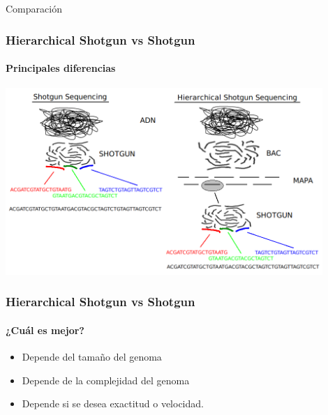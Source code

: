 %


\frame
{
\begin{center}
	\Huge{Comparación}
\end{center}
}

\frame
{
\frametitle{Hierarchical Shotgun vs Shotgun}
\framesubtitle{Principales diferencias}
\begin{center}
	\includegraphics[width=0.9\textwidth]{img/comparacion}
\end{center}
}

\frame
{
\frametitle{Hierarchical Shotgun vs Shotgun}
\framesubtitle{¿Cuál es mejor?}
\begin{itemize}
	\item Depende del tamaño del genoma
	\item Depende de la complejidad del genoma
	\item Depende si se desea exactitud o velocidad.
\end{itemize}
}
